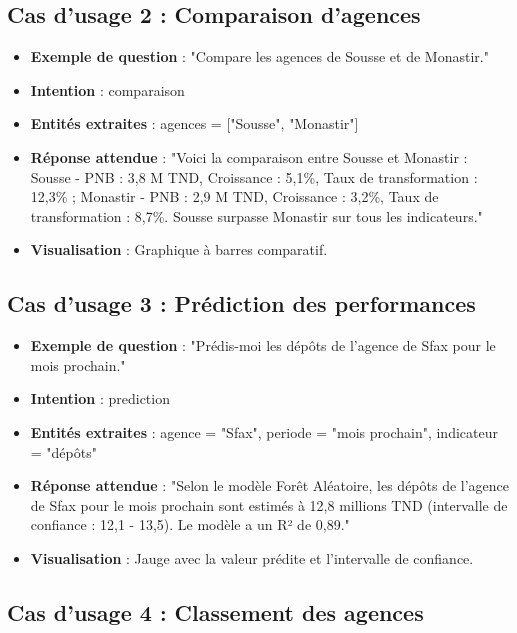\subsection{Cas d'usage 2 : Comparaison d'agences}

\begin{itemize}
    \item \textbf{Exemple de question} : "Compare les agences de Sousse et de Monastir."
    \item \textbf{Intention} : comparaison
    \item \textbf{Entités extraites} : agences = ["Sousse", "Monastir"]
    \item \textbf{Réponse attendue} : "Voici la comparaison entre Sousse et Monastir : Sousse - PNB : 3,8 M TND, Croissance : 5,1\%, Taux de transformation : 12,3\% ; Monastir - PNB : 2,9 M TND, Croissance : 3,2\%, Taux de transformation : 8,7\%. Sousse surpasse Monastir sur tous les indicateurs."
    \item \textbf{Visualisation} : Graphique à barres comparatif.
\end{itemize}

\subsection{Cas d'usage 3 : Prédiction des performances}

\begin{itemize}
    \item \textbf{Exemple de question} : "Prédis-moi les dépôts de l'agence de Sfax pour le mois prochain."
    \item \textbf{Intention} : prediction
    \item \textbf{Entités extraites} : agence = "Sfax", periode = "mois prochain", indicateur = "dépôts"
    \item \textbf{Réponse attendue} : "Selon le modèle Forêt Aléatoire, les dépôts de l'agence de Sfax pour le mois prochain sont estimés à 12,8 millions TND (intervalle de confiance : 12,1 - 13,5). Le modèle a un R² de 0,89."
    \item \textbf{Visualisation} : Jauge avec la valeur prédite et l'intervalle de confiance.
\end{itemize}

\subsection{Cas d'usage 4 : Classement des agences}

